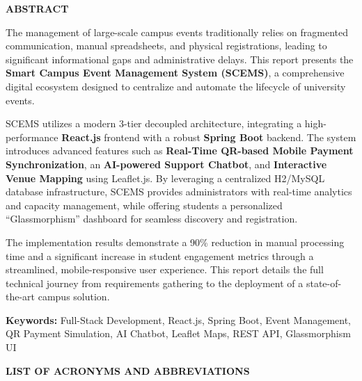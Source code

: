 \documentclass[12pt,a4paper]{report}
\begin{document}
\newpage
\thispagestyle{empty}
\begin{center}
{\LARGE \textbf{ABSTRACT}}
\end{center}
\vspace{1cm}

The management of large-scale campus events traditionally relies on fragmented communication, manual spreadsheets, and physical registrations, leading to significant informational gaps and administrative delays. This report presents the \textbf{Smart Campus Event Management System (SCEMS)}, a comprehensive digital ecosystem designed to centralize and automate the lifecycle of university events.

SCEMS utilizes a modern 3-tier decoupled architecture, integrating a high-performance \textbf{React.js} frontend with a robust \textbf{Spring Boot} backend. The system introduces advanced features such as \textbf{Real-Time QR-based Mobile Payment Synchronization}, an \textbf{AI-powered Support Chatbot}, and \textbf{Interactive Venue Mapping} using Leaflet.js. By leveraging a centralized H2/MySQL database infrastructure, SCEMS provides administrators with real-time analytics and capacity management, while offering students a personalized ``Glassmorphism'' dashboard for seamless discovery and registration.

The implementation results demonstrate a 90\% reduction in manual processing time and a significant increase in student engagement metrics through a streamlined, mobile-responsive user experience. This report details the full technical journey from requirements gathering to the deployment of a state-of-the-art campus solution.

\textbf{Keywords:} Full-Stack Development, React.js, Spring Boot, Event Management, QR Payment Simulation, AI Chatbot, Leaflet Maps, REST API, Glassmorphism UI

\newpage
\listoffigures
{}

\newpage
\listoftables
{}

\newpage
\begin{center}
{\LARGE \textbf{LIST OF ACRONYMS AND ABBREVIATIONS}}
\end{center}
\vspace{1cm}
\end{document}
